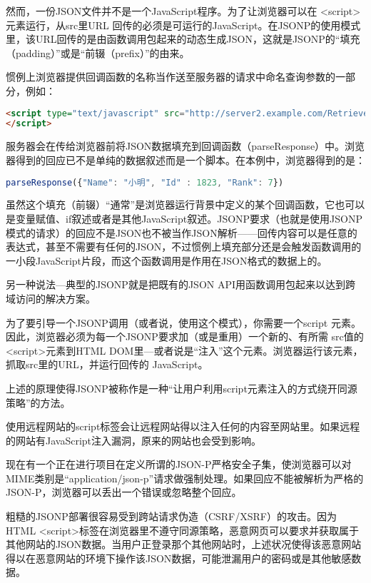 然而，一份JSON文件并不是一个JavaScript程序。为了让浏览器可以在 <script>元素运行，从src里URL 回传的必须是可运行的JavaScript。在JSONP的使用模式里，该URL回传的是由函数调用包起来的动态生成JSON，这就是JSONP的“填充（padding）”或是“前辍（prefix）”的由来。

惯例上浏览器提供回调函数的名称当作送至服务器的请求中命名查询参数的一部分，例如：

\begin{lstlisting}[language=HTML]
<script type="text/javascript" src="http://server2.example.com/RetrieveUser?UserId=1823&jsonp=parseResponse">
</script>
\end{lstlisting}

服务器会在传给浏览器前将JSON数据填充到回调函数（parseResponse）中。浏览器得到的回应已不是单纯的数据叙述而是一个脚本。在本例中，浏览器得到的是：

\begin{lstlisting}[language=JavaScript]
parseResponse({"Name": "小明", "Id" : 1823, "Rank": 7})
\end{lstlisting}

虽然这个填充（前辍）“通常”是浏览器运行背景中定义的某个回调函数，它也可以是变量赋值、if叙述或者是其他JavaScript叙述。JSONP要求（也就是使用JSONP模式的请求）的回应不是JSON也不被当作JSON解析——回传内容可以是任意的表达式，甚至不需要有任何的JSON，不过惯例上填充部分还是会触发函数调用的一小段JavaScript片段，而这个函数调用是作用在JSON格式的数据上的。


另一种说法—典型的JSONP就是把既有的JSON API用函数调用包起来以达到跨域访问的解决方案。

为了要引导一个JSONP调用（或者说，使用这个模式），你需要一个script 元素。因此，浏览器必须为每一个JSONP要求加（或是重用）一个新的、有所需 src值的 <script>元素到HTML DOM里—或者说是“注入”这个元素。浏览器运行该元素，抓取src里的URL，并运行回传的 JavaScript。


上述的原理使得JSONP被称作是一种“让用户利用script元素注入的方式绕开同源策略”的方法。

使用远程网站的script标签会让远程网站得以注入任何的内容至网站里。如果远程的网站有JavaScript注入漏洞，原来的网站也会受到影响。


现在有一个正在进行项目在定义所谓的JSON-P严格安全子集，使浏览器可以对MIME类别是“application/json-p”请求做强制处理。如果回应不能被解析为严格的JSON-P，浏览器可以丢出一个错误或忽略整个回应。

粗糙的JSONP部署很容易受到跨站请求伪造（CSRF/XSRF）的攻击。因为HTML <script>标签在浏览器里不遵守同源策略，恶意网页可以要求并获取属于其他网站的JSON数据。当用户正登录那个其他网站时，上述状况使得该恶意网站得以在恶意网站的环境下操作该JSON数据，可能泄漏用户的密码或是其他敏感数据。


